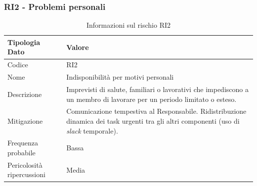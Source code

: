 \documentclass[a4paper,12pt]{article}
\begin{document}
\subsubsection{RI2 - Problemi personali}
\begin{table}[H]
    \centering
    \renewcommand{\arraystretch}{1.4}
    \begin{tabularx}{\textwidth}{|L|Z|}
        \hline
        \textbf{Tipologia Dato} & \textbf{Valore} \\
        \hline
        Codice & RI2 \\
        \hline
        Nome & Indisponibilità per motivi personali \\
        \hline
        Descrizione & Imprevisti di salute, familiari o lavorativi che impediscono a un membro di lavorare per un periodo limitato o esteso. \\
        \hline
        Mitigazione & Comunicazione tempestiva al Responsabile. Ridistribuzione dinamica dei task urgenti tra gli altri componenti (uso di \textit{slack} temporale). \\
        \hline
        Frequenza probabile & Bassa \\
        \hline
        Pericolosità ripercussioni & Media \\
        \hline
    \end{tabularx}
    \caption{Informazioni sul rischio RI2}
    \label{tab:RI2}
\end{table}
\end{document}
